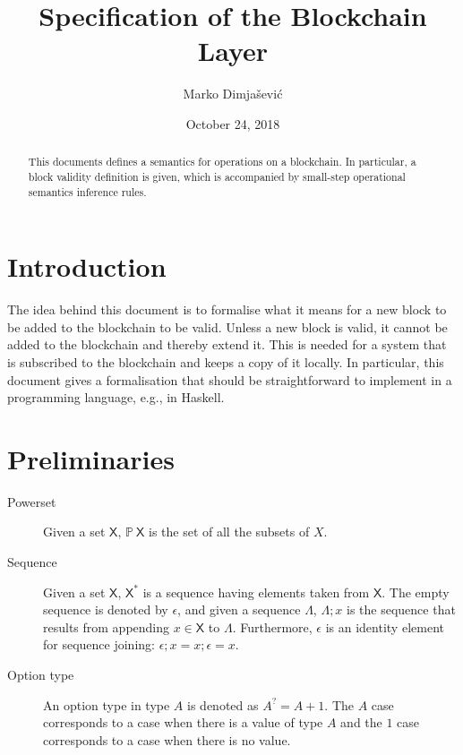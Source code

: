 \documentclass[11pt,a4paper]{article}
\newcommand{\powerset}[1]{\mathbb{P}~#1}
\newcommand{\type}[1]{\mathsf{#1}}
\newcommand{\seqof}[1]{#1^{*}}
\begin{document}
\title{Specification of the Blockchain Layer}

\author{Marko Dimjašević}

\date{October 24, 2018}

\maketitle

\begin{abstract}
This documents defines a semantics for operations on a blockchain.
%
In particular, a block validity definition is given, which is accompanied by
small-step operational semantics inference rules.
\end{abstract}

\tableofcontents
\listoffigures

\section{Introduction}
\label{sec:introduction}

The idea behind this document is to formalise what it means for a new block to
be added to the blockchain to be valid.
%
Unless a new block is valid, it cannot be added to the blockchain and thereby
extend it.
%
This is needed for a system that is subscribed to the blockchain and keeps a
copy of it locally.
%
In particular, this document gives a formalisation that should be
straightforward to implement in a programming language, e.g., in Haskell.


\section{Preliminaries}
\label{sec:preliminaries}

\begin{description}
\item[Powerset] Given a set $\type{X}$, $\powerset{\type{X}}$ is the set of all
  the subsets of $X$.
\item[Sequence] Given a set $\type{X}$, $\seqof{\type{X}}$ is a sequence
  having elements taken from $\type{X}$.
  The empty sequence is denoted by $\epsilon$, and given a sequence $\Lambda$,
  $\Lambda; x$ is the sequence that results from appending
  $x \in \type{X}$ to $\Lambda$.
  Furthermore, $\epsilon$ is an identity element for sequence joining:
  $\epsilon; x = x; \epsilon = x$.
\item[Option type] An option type in type $A$ is denoted as $A^? = A + 1$. The
  $A$ case corresponds to a case when there is a value of type $A$ and the $1$
  case corresponds to a case when there is no value.
\end{description}
\end{document}
